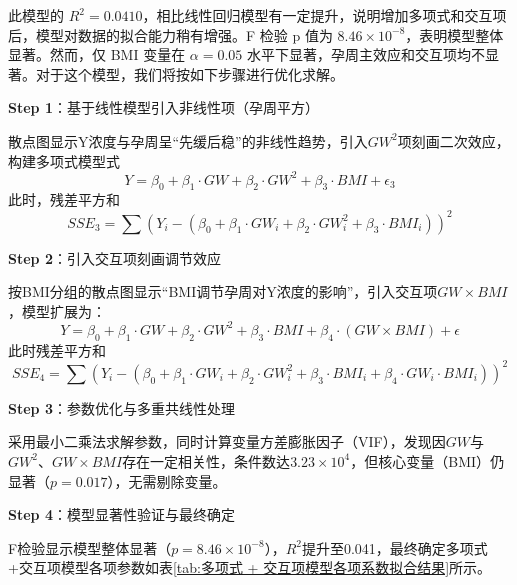 \documentclass[withoutpreface,bwprint]{cumcmthesis} %
\begin{document}
此模型的 $R^2 = 0.0410$，相比线性回归模型有一定提升，说明增加多项式和交互项后，模型对数据的拟合能力稍有增强。F 检验 p 值为 $8.46 \times 10^{-8}$，表明模型整体显著。然而，仅 BMI 变量在 $\alpha = 0.05$ 水平下显著，孕周主效应和交互项均不显著。对于这个模型，我们将按如下步骤进行优化求解。

\textbf{Step 1}：基于线性模型引入非线性项（孕周平方）

散点图显示Y浓度与孕周呈“先缓后稳”的非线性趋势，引入$GW^2$项刻画二次效应，构建多项式模型式
\begin{equation}
    Y = \beta_0 + \beta_1 \cdot GW + \beta_2 \cdot GW^2 + \beta_3 \cdot BMI + \epsilon_3
\end{equation}
此时，残差平方和
\begin{equation}
    SSE_3 = \sum (Y_i - (\beta_0 + \beta_1 \cdot GW_i + \beta_2 \cdot GW_i^2 + \beta_3 \cdot BMI_i))^2
\end{equation}


\textbf{Step 2}：引入交互项刻画调节效应

  按BMI分组的散点图显示“BMI调节孕周对Y浓度的影响”，引入交互项$GW \times BMI$，模型扩展为：
  \begin{equation}
    Y = \beta_0 + \beta_1 \cdot GW + \beta_2 \cdot GW^2 + \beta_3 \cdot BMI + \beta_4 \cdot (GW \times BMI) + \epsilon
  \end{equation} 
  此时残差平方和
  \begin{equation}
    SSE_4 = \sum (Y_i - (\beta_0 + \beta_1 \cdot GW_i + \beta_2 \cdot GW_i^2 + \beta_3 \cdot BMI_i + \beta_4 \cdot GW_i \cdot BMI_i))^2
  \end{equation}

\textbf{Step 3}：参数优化与多重共线性处理

  采用最小二乘法求解参数，同时计算变量方差膨胀因子（VIF），发现因$GW$与$GW^2$、$GW \times BMI$存在一定相关性，条件数达$3.23 \times 10^4$，但核心变量（BMI）仍显著（$p=0.017$），无需剔除变量。

\textbf{Step 4}：模型显著性验证与最终确定

  F检验显示模型整体显著（$p=8.46 \times 10^{-8}$），$R^2$提升至0.041，最终确定多项式+交互项模型各项参数如表\ref{tab:多项式 + 交互项模型各项系数拟合结果}所示。
\end{document}
